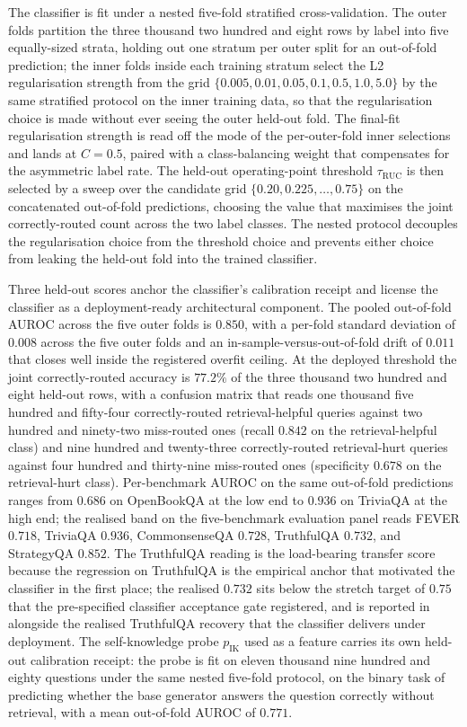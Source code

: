 The classifier is fit under a nested five-fold stratified cross-validation. The outer folds partition the three thousand two hundred and eight rows by label into five equally-sized strata, holding out one stratum per outer split for an out-of-fold prediction; the inner folds inside each training stratum select the L2 regularisation strength from the grid $\{0.005, 0.01, 0.05, 0.1, 0.5, 1.0, 5.0\}$ by the same stratified protocol on the inner training data, so that the regularisation choice is made without ever seeing the outer held-out fold. The final-fit regularisation strength is read off the mode of the per-outer-fold inner selections and lands at $C = 0.5$, paired with a class-balancing weight that compensates for the asymmetric label rate. The held-out operating-point threshold $\tau_{\text{RUC}}$ is then selected by a sweep over the candidate grid $\{0.20, 0.225, \ldots, 0.75\}$ on the concatenated out-of-fold predictions, choosing the value that maximises the joint correctly-routed count across the two label classes. The nested protocol decouples the regularisation choice from the threshold choice and prevents either choice from leaking the held-out fold into the trained classifier.

Three held-out scores anchor the classifier's calibration receipt and license the classifier as a deployment-ready architectural component. The pooled out-of-fold AUROC across the five outer folds is $0.850$, with a per-fold standard deviation of $0.008$ across the five outer folds and an in-sample-versus-out-of-fold drift of $0.011$ that closes well inside the registered overfit ceiling. At the deployed threshold the joint correctly-routed accuracy is $77.2\%$ of the three thousand two hundred and eight held-out rows, with a confusion matrix that reads one thousand five hundred and fifty-four correctly-routed retrieval-helpful queries against two hundred and ninety-two miss-routed ones (recall $0.842$ on the retrieval-helpful class) and nine hundred and twenty-three correctly-routed retrieval-hurt queries against four hundred and thirty-nine miss-routed ones (specificity $0.678$ on the retrieval-hurt class). Per-benchmark AUROC on the same out-of-fold predictions ranges from $0.686$ on OpenBookQA at the low end to $0.936$ on TriviaQA at the high end; the realised band on the five-benchmark evaluation panel reads FEVER $0.718$, TriviaQA $0.936$, CommonsenseQA $0.728$, TruthfulQA $0.732$, and StrategyQA $0.852$. The TruthfulQA reading is the load-bearing transfer score because the regression on TruthfulQA is the empirical anchor that motivated the classifier in the first place; the realised $0.732$ sits below the stretch target of $0.75$ that the pre-specified classifier acceptance gate registered, and is reported in  alongside the realised TruthfulQA recovery that the classifier delivers under deployment. The self-knowledge probe $p_{\text{IK}}$ used as a feature carries its own held-out calibration receipt: the probe is fit on eleven thousand nine hundred and eighty questions under the same nested five-fold protocol, on the binary task of predicting whether the base generator answers the question correctly without retrieval, with a mean out-of-fold AUROC of $0.771$.

